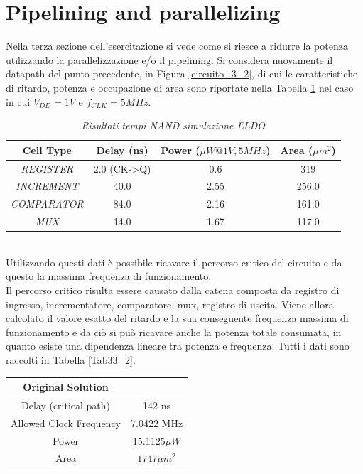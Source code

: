 {\section{Pipelining and parallelizing}
Nella terza sezione dell'esercitazione si vede come si riesce a ridurre la potenza utilizzando la parallelizzazione e/o il pipelining. Si considera nuovamente il datapath del punto precedente, in Figura \ref{circuito_3_2}, di cui le caratteristiche di ritardo, potenza e occupazione di area sono riportate nella Tabella \ref{Tab33_1} nel caso in cui $V_{DD}=1 V$ e $f_{CLK}=5 MHz$.
\begin{table}[!h]\footnotesize
	\centering
	\begin{tabular}{|c|c|c|c|}
		\hline
		\textbf{Cell Type}& \textbf{Delay (ns)} & \textbf{Power ($\mu W @1 V, 5 MHz$)} & \textbf{Area ($\mu m^{2}$)} \\
		\hline
		\textit{REGISTER}& 2.0 (CK->Q) & 0.6 & 319 \\
	\textit{INCREMENT}& 40.0 & 2.55 & 256.0 \\
		\textit{COMPARATOR} & 84.0 & 2.16 & 161.0\\
		\textit{MUX} & 14.0 & 1.67& 117.0\\
		\hline
	\end{tabular}
	\caption{\textit{Risultati tempi NAND simulazione ELDO}}
	\label{Tab33_1}
\end{table}
\\
Utilizzando questi dati è possibile ricavare il percorso critico del circuito e da questo la massima frequenza di funzionamento.\\
Il percorso critico risulta essere causato dalla catena composta da registro di ingresso, incrementatore, comparatore, mux, registro di uscita. Viene allora calcolato il valore esatto del ritardo e la sua conseguente frequenza massima di funzionamento e da ciò si può ricavare anche la potenza totale consumata, in quanto esiste una dipendenza lineare tra potenza e frequenza. Tutti i dati sono raccolti in Tabella \ref{Tab33_2}.
\begin{table}[!h]\footnotesize
	\centering
	\begin{tabular}{|c|c|}
		\hline
		\textbf{Original Solution} & \\
		\hline
		Delay (critical path) & 142 ns\\
		Allowed Clock Frequency & 7.0422 MHz\\
		Power & $15.1125 \mu W$\\
		Area & $1747 \mu m^{2}$\\

\end{tabular}
\end{table}}
